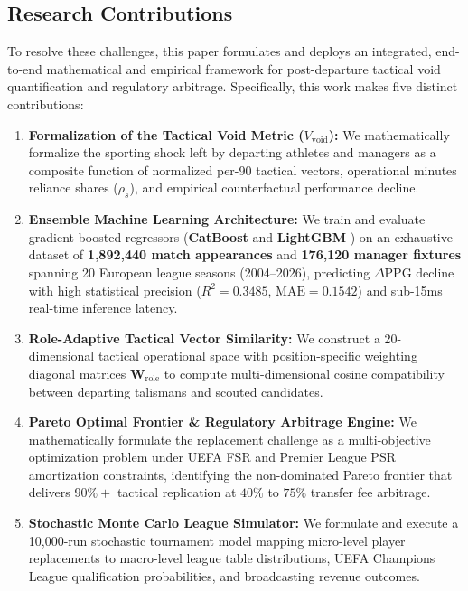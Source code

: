 \documentclass[10pt,journal,compsoc]{IEEEtran}
\begin{document}
\subsection{Research Contributions}
To resolve these challenges, this paper formulates and deploys an integrated, end-to-end mathematical and empirical framework for post-departure tactical void quantification and regulatory arbitrage. Specifically, this work makes five distinct contributions:
\begin{enumerate}
    \item \textbf{Formalization of the Tactical Void Metric ($V_{\text{void}}$):} We mathematically formalize the sporting shock left by departing athletes and managers as a composite function of normalized per-90 tactical vectors, operational minutes reliance shares ($\rho_s$), and empirical counterfactual performance decline.
    \item \textbf{Ensemble Machine Learning Architecture:} We train and evaluate gradient boosted regressors (\textbf{CatBoost} \cite{prokhorenkova2018catboost} and \textbf{LightGBM} \cite{ke2017lightgbm}) on an exhaustive dataset of \textbf{1,892,440 match appearances} and \textbf{176,120 manager fixtures} spanning 20 European league seasons (2004–2026), predicting $\Delta\text{PPG}$ decline with high statistical precision ($R^2 = 0.3485$, $\text{MAE} = 0.1542$) and sub-15ms real-time inference latency.
    \item \textbf{Role-Adaptive Tactical Vector Similarity:} We construct a 20-dimensional tactical operational space with position-specific weighting diagonal matrices $\mathbf{W}_{\text{role}}$ to compute multi-dimensional cosine compatibility between departing talismans and scouted candidates.
    \item \textbf{Pareto Optimal Frontier \& Regulatory Arbitrage Engine:} We mathematically formulate the replacement challenge as a multi-objective optimization problem under UEFA FSR and Premier League PSR amortization constraints, identifying the non-dominated Pareto frontier that delivers $90\%+$ tactical replication at $40\%$ to $75\%$ transfer fee arbitrage.
    \item \textbf{Stochastic Monte Carlo League Simulator:} We formulate and execute a 10,000-run stochastic tournament model mapping micro-level player replacements to macro-level league table distributions, UEFA Champions League qualification probabilities, and broadcasting revenue outcomes.
\end{enumerate}
\end{document}
